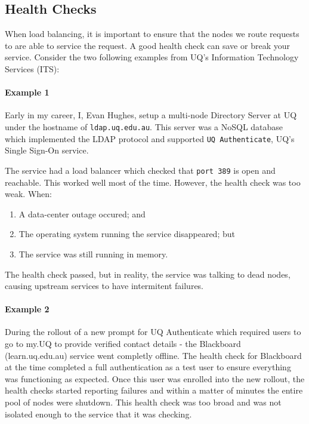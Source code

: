 \documentclass{csse4400}
\begin{document}
\subsection{Health Checks}

When load balancing, it is important to ensure that the nodes we route requests to are able to service the request.
A good health check can save or break your service.
Consider the two following examples from UQ's Information Technology Services (ITS):

\paragraph{Example 1} Early in my career, I, Evan Hughes, setup a multi-node Directory Server at UQ under the hostname of \texttt{ldap.uq.edu.au}.
This server was a NoSQL database which implemented the LDAP protocol and supported \texttt{UQ Authenticate},
UQ's Single Sign-On service.

The service had a load balancer which checked that \texttt{port 389} is open and reachable. 
This worked well most of the time.
However, the health check was too weak. When:
\begin{enumerate} 
    \item A data-center outage occured; and
    \item The operating system running the service disappeared; but 
    \item The service was still running in memory.
\end{enumerate}

The health check passed, but in reality, the service was talking to dead nodes, causing upstream services to have intermitent failures. 


\paragraph{Example 2} During the rollout of a new prompt for UQ Authenticate which required users to go to my.UQ to provide verified contact details - the Blackboard (learn.uq.edu.au) service went completly offline.
The health check for Blackboard at the time completed a full authentication as a test user to ensure everything was functioning as expected.
Once this user was enrolled into the new rollout,
the health checks started reporting failures and within a matter of minutes the entire pool of nodes were shutdown.
This health check was too broad and was not isolated enough to the service that it was checking.
\end{document}
